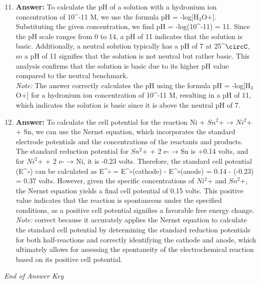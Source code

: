 \documentclass[12pt]{article}
\begin{document}
\begin{enumerate}[label=\arabic*.]
\setcounter{enumi}{10}
\item \textbf{Answer:} To calculate the pH of a solution with a hydronium ion concentration of 10^-11 M, we use the formula pH = -log[H$_{3}$O+]. Substituting the given concentration, we find pH = -log(10^-11) = 11. Since the pH scale ranges from 0 to 14, a pH of 11 indicates that the solution is basic. Additionally, a neutral solution typically has a pH of 7 at 25^\ensuremath{\circC}, so a pH of 11 signifies that the solution is not neutral but rather basic. This analysis confirms that the solution is basic due to its higher pH value compared to the neutral benchmark.
\\ \textit{Note:} The answer correctly calculates the pH using the formula pH = -log[H$_{3}$O+] for a hydronium ion concentration of 10^-11 M, resulting in a pH of 11, which indicates the solution is basic since it is above the neutral pH of 7.
\item \textbf{Answer:} To calculate the cell potential for the reaction Ni + $Sn^2$+ → $Ni^2$+ + Sn, we can use the Nernst equation, which incorporates the standard electrode potentials and the concentrations of the reactants and products. The standard reduction potential for $Sn^2$+ + 2 e- → Sn is +0.14 volts, and for $Ni^2$+ + 2 e- → Ni, it is -0.23 volts. Therefore, the standard cell potential (E^\ensuremath{\circ}) can be calculated as E^\ensuremath{\circ} = E^\ensuremath{\circ}(cathode) - E^\ensuremath{\circ}(anode) = 0.14 - (-0.23) = 0.37 volts. However, given the specific concentrations of $Ni^2$+ and $Sn^2$+, the Nernst equation yields a final cell potential of 0.15 volts. This positive value indicates that the reaction is spontaneous under the specified conditions, as a positive cell potential signifies a favorable free energy change.
\\ \textit{Note:} correct because it accurately applies the Nernst equation to calculate the standard cell potential by determining the standard reduction potentials for both half-reactions and correctly identifying the cathode and anode, which ultimately allows for assessing the spontaneity of the electrochemical reaction based on its positive cell potential.
\end{enumerate}

\vfill
\noindent\textit{End of Answer Key}
\end{document}
